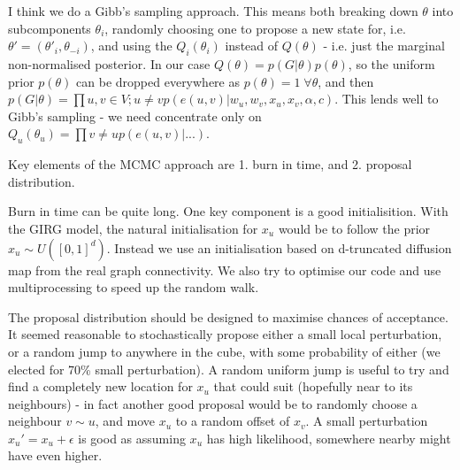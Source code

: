 I think we do a Gibb's sampling approach. This means both breaking down $\theta$ into subcomponents $\theta_i$, randomly choosing one to propose a new state for, i.e. $\theta' = (\theta'_i, \theta_{-i})$, and using the $Q_i(\theta_i)$ instead of $Q(\theta)$ - i.e. just the marginal non-normalised posterior. In our case $Q(\theta) = p(G | \theta) p(\theta)$, so the uniform prior $p(\theta)$ can be dropped everywhere as $p(\theta) = 1\; \forall \theta$, and then $p(G | \theta) = \prod{u, v \in V; u \neq v} p(e(u,v) | w_u, w_v, x_u, x_v, \alpha, c)$. This lends well to Gibb's sampling - we need concentrate only on $Q_u(\theta_u) = \prod{v \neq u} p(e(u,v) | ...)$.

Key elements of the MCMC approach are 1. burn in time, and 2. proposal distribution. 

Burn in time can be quite long. One key component is a good initialisition. With the GIRG model, the natural initialisation for $x_u$ would be to follow the prior $x_u \sim U([0, 1]^d)$. Instead we use an initialisation based on d-truncated diffusion map from the real graph connectivity. We also try to optimise our code and use multiprocessing to speed up the random walk.

The proposal distribution should be designed to maximise chances of acceptance. It seemed reasonable to stochastically propose either a small local perturbation, or a random jump to anywhere in the cube, with some probability of either (we elected for 70\% small perturbation). A random uniform jump is useful to try and find a completely new location for $x_u$ that could suit (hopefully near to its neighbours) - in fact another good proposal would be to randomly choose a neighbour $v \sim u$, and move $x_u$ to a random offset of $x_v$. A small perturbation $x_u' = x_u + \epsilon$ is good as assuming $x_u$ has high likelihood, somewhere nearby might have even higher.


